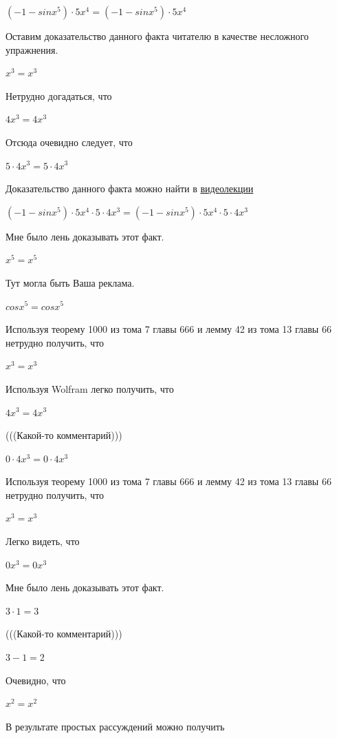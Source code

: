 \documentclass[12pt,a4paper,fleqn]{article}
\theoremstyle{definition}
\begin{document}
$( -1  - sin{ x }^{ 5 }) \cdot  5 { x }^{ 4 } = ( -1  - sin{ x }^{ 5 }) \cdot  5 { x }^{ 4 }$

Оставим доказательство данного факта читателю в качестве несложного упражнения. 

${ x }^{ 3 } = { x }^{ 3 }$

Нетрудно догадаться, что 

$ 4 { x }^{ 3 } =  4 { x }^{ 3 }$

Отсюда очевидно следует, что 

$ 5  \cdot  4 { x }^{ 3 } =  5  \cdot  4 { x }^{ 3 }$

Доказательство данного факта можно найти в \href{https://www.youtube.com/watch?v=dQw4w9WgXcQ}{видеолекции} 

$( -1  - sin{ x }^{ 5 }) \cdot  5 { x }^{ 4 } \cdot  5  \cdot  4 { x }^{ 3 } = ( -1  - sin{ x }^{ 5 }) \cdot  5 { x }^{ 4 } \cdot  5  \cdot  4 { x }^{ 3 }$

Мне было лень доказывать этот факт.

${ x }^{ 5 } = { x }^{ 5 }$

Тут могла быть Ваша реклама. 

$cos{ x }^{ 5 } = cos{ x }^{ 5 }$

Используя теорему 1000 из тома 7 главы 666 и лемму 42 из тома 13 главы 66 нетрудно получить, что 

${ x }^{ 3 } = { x }^{ 3 }$

Используя Wolfram легко получить, что 

$ 4 { x }^{ 3 } =  4 { x }^{ 3 }$

(((Какой-то комментарий))) 

$ 0  \cdot  4 { x }^{ 3 } =  0  \cdot  4 { x }^{ 3 }$

Используя теорему 1000 из тома 7 главы 666 и лемму 42 из тома 13 главы 66 нетрудно получить, что 

${ x }^{ 3 } = { x }^{ 3 }$

Легко видеть, что 

$ 0 { x }^{ 3 } =  0 { x }^{ 3 }$

Мне было лень доказывать этот факт.

$ 3  \cdot  1  =  3 $

(((Какой-то комментарий))) 

$ 3  -  1  =  2 $

Очевидно, что 

${ x }^{ 2 } = { x }^{ 2 }$

В результате простых рассуждений можно получить 
\end{document}
